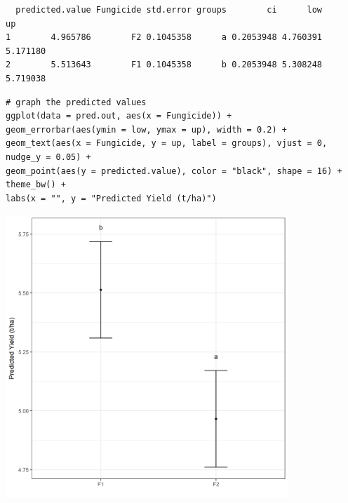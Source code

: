 \documentclass[a4paper, 10pt, fleqn, twosided]{memoir}
\begin{document}
\begin{tcolorbox}[title = Example 5 Tukey's multiple comparison output]
\begin{verbatim}
  predicted.value Fungicide std.error groups        ci      low       up
1        4.965786        F2 0.1045358      a 0.2053948 4.760391 5.171180
2        5.513643        F1 0.1045358      b 0.2053948 5.308248 5.719038

\end{verbatim}
\end{tcolorbox}

\begin{tcolorbox}[title = Example 5 Graph of predicted values]
\begin{verbatim}
# graph the predicted values 
ggplot(data = pred.out, aes(x = Fungicide)) +
geom_errorbar(aes(ymin = low, ymax = up), width = 0.2) +
geom_text(aes(x = Fungicide, y = up, label = groups), vjust = 0, nudge_y = 0.05) +
geom_point(aes(y = predicted.value), color = "black", shape = 16) + theme_bw() +
labs(x = "", y = "Predicted Yield (t/ha)")
\end{verbatim}
\end{tcolorbox}


\begin{tcolorbox}[title = Example 5 Graph of predicted Fungicide values]
\includegraphics[width=0.8\textwidth, frame]{Example5FungPred.png}
\end{tcolorbox}
\clearpage
\end{document}
